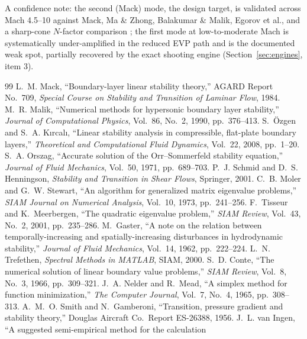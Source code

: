 \documentclass[11pt]{article}
\begin{document}
A confidence note: the second (Mack) mode, the design target, is validated across
Mach 4.5--10 against Mack, Ma \& Zhong, Balakumar \& Malik, Egorov et al., and a sharp-cone
$N$-factor comparison \cite{mack1984,mazhong2003,balakumar1992}; the first mode at low-to-moderate
Mach is systematically under-amplified in the reduced EVP path and is the documented weak spot,
partially recovered by the exact shooting engine (Section~\ref{sec:engines}, item 3).

\begin{thebibliography}{99}
 L.~M. Mack, ``Boundary-layer linear stability theory,'' AGARD Report No.~709,
  \emph{Special Course on Stability and Transition of Laminar Flow}, 1984.
 M.~R. Malik, ``Numerical methods for hypersonic boundary layer stability,''
  \emph{Journal of Computational Physics}, Vol.~86, No.~2, 1990, pp.~376--413.
 S.~\"Ozgen and S.~A. K{\i}rcal{\i}, ``Linear stability analysis in
  compressible, flat-plate boundary layers,'' \emph{Theoretical and Computational Fluid
  Dynamics}, Vol.~22, 2008, pp.~1--20.
 S.~A. Orszag, ``Accurate solution of the Orr--Sommerfeld stability
  equation,'' \emph{Journal of Fluid Mechanics}, Vol.~50, 1971, pp.~689--703.
 P.~J. Schmid and D.~S. Henningson, \emph{Stability and Transition in Shear
  Flows}, Springer, 2001.
 C.~B. Moler and G.~W. Stewart, ``An algorithm for generalized matrix
  eigenvalue problems,'' \emph{SIAM Journal on Numerical Analysis}, Vol.~10, 1973, pp.~241--256.
 F.~Tisseur and K.~Meerbergen, ``The quadratic eigenvalue problem,''
  \emph{SIAM Review}, Vol.~43, No.~2, 2001, pp.~235--286.
 M.~Gaster, ``A note on the relation between temporally-increasing and
  spatially-increasing disturbances in hydrodynamic stability,'' \emph{Journal of Fluid
  Mechanics}, Vol.~14, 1962, pp.~222--224.
 L.~N. Trefethen, \emph{Spectral Methods in MATLAB}, SIAM, 2000.
 S.~D. Conte, ``The numerical solution of linear boundary value problems,''
  \emph{SIAM Review}, Vol.~8, No.~3, 1966, pp.~309--321.
 J.~A. Nelder and R.~Mead, ``A simplex method for function
  minimization,'' \emph{The Computer Journal}, Vol.~7, No.~4, 1965, pp.~308--313.
 A.~M.~O. Smith and N.~Gamberoni, ``Transition, pressure gradient and
  stability theory,'' Douglas Aircraft Co.\ Report ES-26388, 1956.
 J.~L. van Ingen, ``A suggested semi-empirical method for the calculation

\end{thebibliography}
\end{document}
